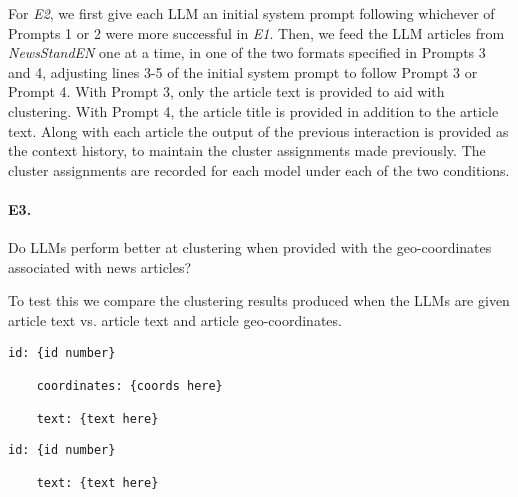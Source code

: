 For \emph{E2}, we first give each LLM an initial system prompt following whichever of Prompts 1 or 2 were more successful in \emph{E1}.
Then, we feed the LLM articles from \emph{NewsStandEN} one at a time, in one of the two formats specified in Prompts 3 and 4, adjusting lines 3-5 of the initial system prompt to follow Prompt 3 or Prompt 4. 
With Prompt 3, only the article text is provided to aid with clustering.
With Prompt 4, the article title is provided in addition to the article text.
Along with each article the output of the previous interaction is provided as the context history, to maintain the cluster assignments made previously.
The cluster assignments are recorded for each model under each of the two conditions.

    
    


\paragraph{\textbf{E3.}}
Do LLMs perform better at clustering when provided with the geo-coordinates associated with news articles? 

\noindent To test this we compare the clustering results produced when the LLMs are given article text vs. article text and article geo-coordinates. 
    
\begin{lstlisting}[title=Prompt 5: Geo-coords Prompt]
    id: {id number}
    
    coordinates: {coords here}

    text: {text here}
    \end{lstlisting}
    \begin{lstlisting}[title=Prompt 6: No Geo-coords Prompt]
    id: {id number}

    text: {text here}
\end{lstlisting}



